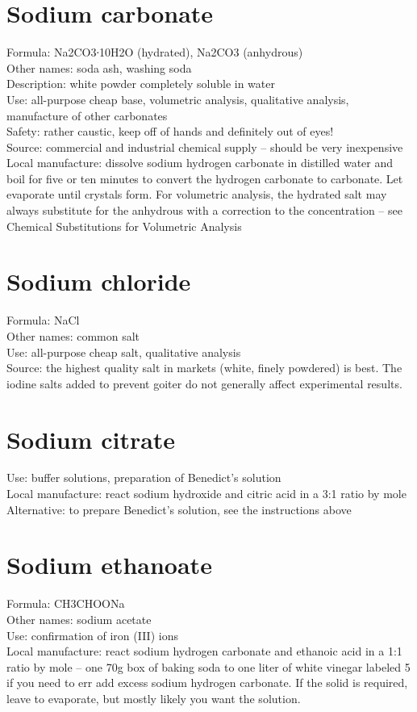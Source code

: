 \section{Sodium carbonate}
Formula: Na2CO3∙10H2O (hydrated), 
Na2CO3 (anhydrous)\\
Other names: soda ash, washing soda\\
Description: white powder completely soluble in water\\
Use: all-purpose cheap base, 
volumetric analysis, 
qualitative analysis, 
manufacture of other carbonates\\
Safety: rather caustic, keep off of hands and definitely out of eyes!\\
Source: commercial and industrial chemical supply – 
should be very inexpensive\\
Local manufacture: dissolve sodium hydrogen carbonate in distilled water 
and boil for five or ten minutes 
to convert the hydrogen carbonate to carbonate. 
Let evaporate until crystals form. 
For volumetric analysis, 
the hydrated salt may always substitute 
for the anhydrous with a correction to the concentration – 
see Chemical Substitutions for Volumetric Analysis

\section{Sodium chloride}
Formula: NaCl\\
Other names: common salt\\
Use: all-purpose cheap salt, 
qualitative analysis\\
Source: the highest quality salt in markets (white, 
finely powdered) is best. 
The iodine salts added to prevent goiter 
do not generally affect experimental results.

\section{Sodium citrate}
Use: buffer solutions, 
preparation of Benedict's solution\\
Local manufacture: react sodium hydroxide 
and citric acid in a 3:1 ratio by mole\\
Alternative: to prepare Benedict's solution, 
see the instructions above

\section{Sodium ethanoate}
Formula: CH3CHOONa\\
Other names: sodium acetate\\
Use: confirmation of iron (III) ions\\
Local manufacture: react sodium hydrogen carbonate 
and ethanoic acid in a 1:1 ratio by mole – 
one 70g box of baking soda to one liter of white vinegar labeled 5%
if you need to err add excess sodium hydrogen carbonate. 
If the solid is required, 
leave to evaporate, 
but mostly likely you want the solution.

